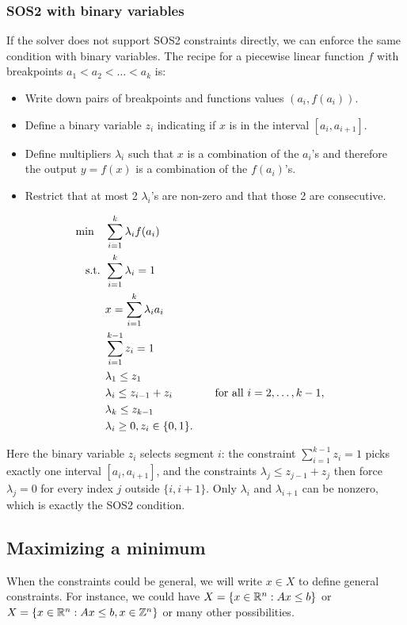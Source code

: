 \subsubsection{SOS2 with binary variables}

If the solver does not support SOS2 constraints directly, we can enforce the same condition with binary variables.  The recipe for a piecewise linear function $f$ with breakpoints $a_1 < a_2 < \dots < a_k$ is:
\begin{itemize}
\item Write down pairs of breakpoints and functions values $(a_i, f(a_i))$.
\item Define a binary variable $z_i$ indicating if $x$ is in the interval $[a_i, a_{i+1}]$.
\item Define multipliers $\lambda_i$ such that $x$ is a combination of the $a_i$'s and therefore the output $y = f(x)$ is a combination of the $f(a_i)$'s.
\item Restrict that at most 2 $\lambda_i$'s are non-zero and that those 2 are consecutive.

\end{itemize}

\begin{align*}
\min \quad & \sum_{i=1}^k \lambda_i f(a_i) \\
\text{ s.t. }        & \sum_{i=1}^k \lambda_i = 1 \\
& x = \sum_{i=1}^k \lambda_i a_i \\
& \sum_{i=1}^{k-1} z_i = 1 \\
& \lambda_1 \leq z_1 \\
& \lambda_i \leq z_{i-1} + z_{i} &&\quad \text{for all } i=2, \dots, k-1, \\
& \lambda_k \leq z_{k-1} \\
& \lambda_i \geq 0, z_i \in \{0,1\}.
\end{align*}

Here the binary variable $z_i$ selects segment $i$: the constraint $\sum_{i=1}^{k-1} z_i = 1$ picks exactly one interval $[a_i, a_{i+1}]$, and the constraints $\lambda_j \leq z_{j-1} + z_j$ then force $\lambda_j = 0$ for every index $j$ outside $\{i, i+1\}$.  Only $\lambda_i$ and $\lambda_{i+1}$ can be nonzero, which is exactly the SOS2 condition.

\subsection{Maximizing a minimum}
When the constraints could be general, we will write $x \in X$ to define general constraints.  For instance, we could have $X = \{ x \in \mathbb{R}^n : Ax \leq b\}$ or $X  = \{ x \in \mathbb{R}^n : Ax \leq b, x \in \mathbb{Z}^n\}$ or many other possibilities.  


